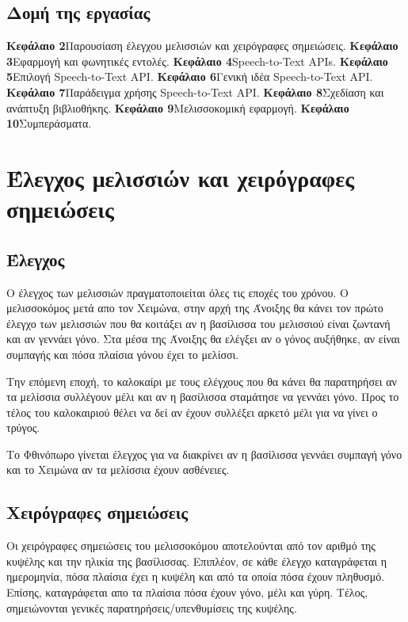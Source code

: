 \documentclass[oneside, 12pt]{book}
\begin{document}
\section{Δομή της εργασίας}\label{sec:δομή-της-εργασίας}
\noindent
\textbf{Κεφάλαιο 2}\quad Παρουσίαση έλεγχου μελισσιών και χειρόγραφες σημειώσεις.\newline
\textbf{Κεφάλαιο 3}\quad Εφαρμογή και φωνητικές εντολές.\newline
\textbf{Κεφάλαιο 4}\quad Speech-to-Text APIs.\newline
\textbf{Κεφάλαιο 5}\quad Επιλογή Speech-to-Text API.\newline
\textbf{Κεφάλαιο 6}\quad Γενική ιδέα Speech-to-Text API.\newline
\textbf{Κεφάλαιο 7}\quad Παράδειγμα χρήσης Speech-to-Text API.\newline
\textbf{Κεφάλαιο 8}\quad Σχεδίαση και ανάπτυξη βιβλιοθήκης.\newline
\textbf{Κεφάλαιο 9}\quad Μελισσοκομική εφαρμογή.\newline
\textbf{Κεφάλαιο 10}\quad Συμπεράσματα.

\chapter{Έλεγχος μελισσιών και χειρόγραφες σημειώσεις}
\label{ch:έλεγχος-μελισσιών-και-χειρόγραφες-σημειώσεις}
\section{Έλεγχος}
\label{sec:έλεγχος}
Ο έλεγχος των μελισσιών πραγματοποιείται όλες τις εποχές του χρόνου.
Ο μελισσοκόμος μετά απο τον Χειμώνα, στην αρχή της Άνοιξης θα κάνει τον πρώτο έλεγχο των μελισσιών
που θα κοιτάξει αν η βασίλισσα του μελισσιού είναι ζωντανή και αν γεννάει γόνο.
Στα μέσα της Άνοιξης θα ελέγξει αν ο γόνος αυξήθηκε, αν είναι συμπαγής και πόσα πλαίσια γόνου έχει το
μελίσσι.\par
Την επόμενη εποχή, το καλοκαίρι με τους ελέγχους που θα κάνει θα παρατηρήσει αν τα μελίσσια συλλέγουν
μέλι και αν η βασίλισσα σταμάτησε να γεννάει γόνο.
Προς το τέλος του καλοκαιριού θέλει να δεί αν έχουν συλλέξει αρκετό μέλι για να γίνει ο τρύγος.\par
Το Φθινόπωρο γίνεται έλεγχος για να διακρίνει αν η βασίλισσα γεννάει συμπαγή γόνο και το Χειμώνα αν
τα μελίσσια έχουν ασθένειες.
\section{Χειρόγραφες σημειώσεις}
\label{sec:χειρόγραφες-σημειώσεις}
Οι χειρόγραφες σημειώσεις του μελισσοκόμου αποτελούνται από τον αριθμό της κυψέλης και την ηλικία της
βασίλισσας.
Επιπλέον, σε κάθε έλεγχο καταγράφεται η ημερομηνία, πόσα πλαίσια έχει η κυψέλη και από τα
οποία πόσα έχουν πληθυσμό.
Επίσης, καταγράφεται απο τα πλαίσια πόσα έχουν γόνο, μέλι και γύρη.
Τέλος, σημειώνονται γενικές παρατηρήσεις/υπενθυμίσεις της κυψέλης.
\end{document}
